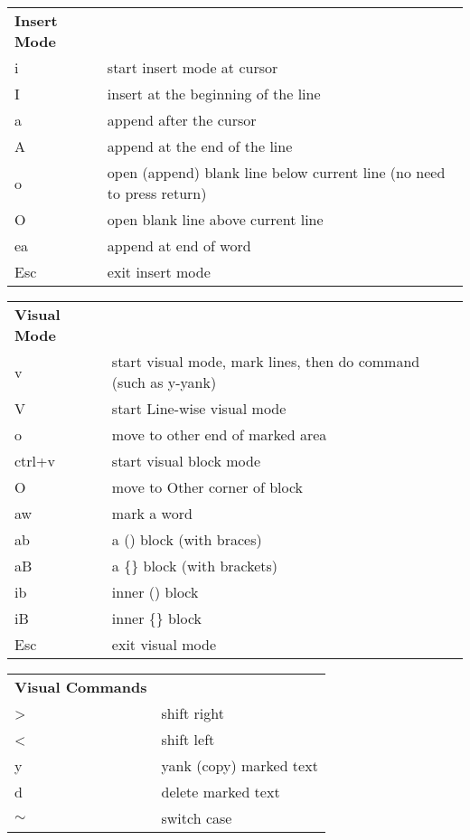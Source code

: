 \documentclass[11pt]{article}
\begin{document}
\bigskip\bigskip

\centering
{}
\begin{tabular}{| l | l |}
  \hline \hline
  \textbf{Insert Mode} & \\
  i    & start insert mode at cursor \\
  I    & insert at the beginning of the line \\
  a    & append after the cursor \\
  A    & append at the end of the line \\
  o    & open (append) blank line below current line (no need to press return) \\
  O    & open blank line above current line \\
  ea   & append at end of word \\
  Esc  & exit insert mode \\
  \hline \hline
\end{tabular}


\bigskip\bigskip

\centering
{}
\begin{tabular}{| l | l |}
  \hline \hline
  \textbf{Visual Mode} & \\
  v       & start visual mode, mark lines, then do command (such as y-yank) \\
  V       & start Line-wise visual mode \\
  o       & move to other end of marked area \\
  ctrl+v  & start visual block mode \\
  O       & move to Other corner of block \\
  aw      & mark a word \\
  ab      & a () block (with braces) \\
  aB      & a \{\} block (with brackets) \\
  ib      & inner () block \\
  iB      & inner \{\} block \\
  Esc     & exit visual mode \\
  \hline \hline
\end{tabular}

\bigskip\bigskip

\centering
{}
\begin{tabular}{| l | l |}
  \hline \hline
  \textbf{Visual Commands} & \\
  >      & shift right \\
  <      & shift left \\
  y      & yank (copy) marked text \\
  d      & delete marked text \\
  $\sim$ & switch case \\
  \hline \hline
\end{tabular}
\end{document}
